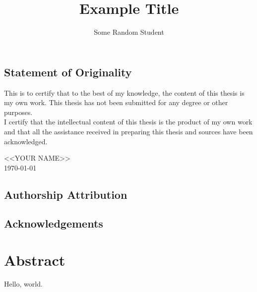 \documentclass[ispdf]{usydthesis}
\title{Example Title}
\author{Some Random Student}
\begin{document}
\pagestyle{empty}
\maketitle

\begin{center}
\section*{Statement of Originality}
\end{center}

This is to certify that to the best of my knowledge, the content of this thesis is my own work. This thesis has not been submitted for any degree or other purposes.\\

\noindent I certify that the intellectual content of this thesis is the product of my own work and that all the assistance received in preparing this thesis and sources have been acknowledged.
\\

\begin{flushright}
\noindent <<YOUR NAME>>\\
\today
\end{flushright}

\newpage
\section*{Authorship Attribution}

%
%

\makededication

\section*{\centering Acknowledgements}

\newpage

\chapter*{Abstract}
\setcounter{page}{5}
Hello, world.
\setcounter{page}{6}
\pagestyle{empty}

\newpage

\begingroup
\hypersetup{linkcolor=black}
\let\cleardoublepage\relax
\let\clearpage\relax
\end{document}
